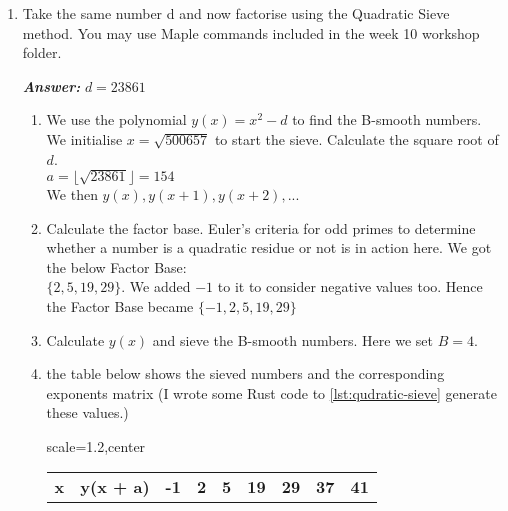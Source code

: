 \documentclass[11pt,a4paper,fleqn]{article}
\makeatletter
\newcommand{\tpmod}[1]{{\@displayfalse\pmod{#1}}}
\newcommand{\qedn}{\tag*{$\blacksquare$}}
\newcommand\Tstrut{\rule{0pt}{2.6ex}}         %
\makeatother
\begin{document}
\begin{enumerate}[1.]
\begin{flushleft}
\begin{enumerate}[i.]
\begin{align*}
                    &i = 37, a = 20741, b = 20741^37\tpmod{23861} = 3792\\
                    &gcd(23861, 3791) = 223 > 1 \implies 223|23861 \text{and is one of the factors}\\
                    &23861/223 = 107 \implies \text{107 is the other factor}\\
                    &23861 = 107 \times 223 \qedn
                \end{align*}
           \end{enumerate}
		\end{flushleft}
		\item Take the same number d and now factorise using the Quadratic Sieve method. You may use Maple commands included in the week 10 workshop folder.

		\begin{flushleft}
			\textbf{\textit{Answer:}} $d = 23861$\\
            \begin{enumerate}[Step 1.]
                \item We use the polynomial $y(x) = x^2 - d$ to find the B-smooth numbers. We initialise $x = \sqrt{500657}$ to start the sieve. Calculate the square root of $d$.\\
                $a = \lfloor\sqrt{23861}\rfloor = 154$\\
                We then $y(x), y(x + 1), y(x + 2), ...$
                \item Calculate the factor base. Euler's criteria for odd primes to determine whether a number is a quadratic residue or not is in action here. We got the below Factor Base: \\
                $\{2, 5, 19, 29\}$. We added $-1$ to it to consider negative values too. Hence the Factor Base became $\{-1, 2, 5, 19, 29\}$
                \item Calculate $y(x)$ and sieve the B-smooth numbers. Here we set $B = 4$.
                \item the table below shows the sieved numbers and the corresponding exponents matrix (I wrote some Rust code to \ref{lst:qudratic-sieve} generate these values.)
                \begin{table}[H]
                    \begin{adjustbox}{scale=1.2,center}
                        \begin{tabular}{ |l|l|l|l|l|l|l|l|l| }
                            \hline
                            \textbf{x} & \textbf{y(x + a)} & \textbf{-1} & \textbf{2} & \textbf{5} & \textbf{19} & \textbf{29} & \textbf{37} & \textbf{41} \Tstrut\\

\end{tabular}
\end{adjustbox}
\end{table}
\end{enumerate}
\end{flushleft}
\end{enumerate}
\end{document}
